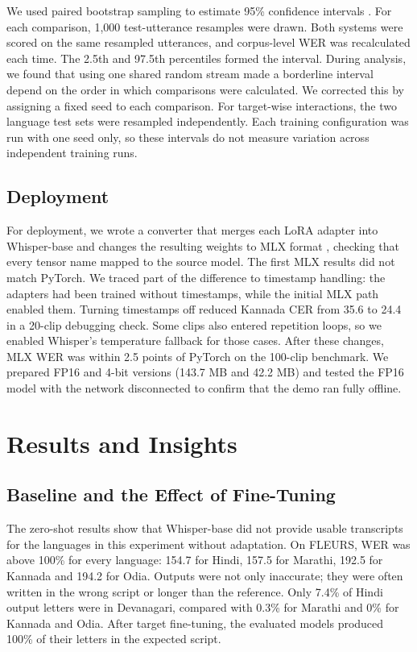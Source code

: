\documentclass[conference]{IEEEtran}
\begin{document}
We used paired bootstrap sampling to estimate 95\% confidence intervals
\cite{bisani2004bootstrap}. For each comparison, 1,000 test-utterance
resamples were drawn. Both systems were scored on the same resampled
utterances, and corpus-level WER was recalculated each time. The 2.5th
and 97.5th percentiles formed the interval. During analysis, we found
that using one shared random stream made a borderline interval depend
on the order in which comparisons were calculated. We corrected this
by assigning a fixed seed to each comparison. For target-wise
interactions, the two language test sets were resampled independently.
Each training configuration was run with one seed only, so these
intervals do not measure variation across independent training runs.

\subsection{Deployment}

For deployment, we wrote a converter that merges each LoRA adapter
into Whisper-base and changes the resulting weights to MLX format
\cite{mlx2023}, checking that every tensor name mapped to the source
model. The first MLX results did not match PyTorch.
We traced part of the difference to timestamp handling: the adapters
had been trained without timestamps, while the initial MLX path enabled
them. Turning timestamps off reduced Kannada CER from 35.6 to 24.4 in
a 20-clip debugging check. Some clips also entered repetition loops, so
we enabled Whisper's temperature fallback for those cases. After these
changes, MLX WER was within 2.5 points of PyTorch on the 100-clip
benchmark. We prepared FP16 and 4-bit versions (143.7 MB and 42.2 MB)
and tested the FP16 model with the network disconnected to confirm that
the demo ran fully offline.

\section{Results and Insights}



\subsection{Baseline and the Effect of Fine-Tuning}

The zero-shot results show that Whisper-base did not provide usable
transcripts for the languages in this experiment without adaptation.
On FLEURS, WER was above 100\% for every language: 154.7 for Hindi,
157.5 for Marathi, 192.5 for Kannada and 194.2 for Odia. Outputs were
not only inaccurate; they were often written in the wrong script or
longer than the reference. Only 7.4\% of Hindi output letters were in
Devanagari, compared with 0.3\% for Marathi and 0\% for Kannada and
Odia. After target fine-tuning, the evaluated models produced 100\% of
their letters in the expected script.
\end{document}
